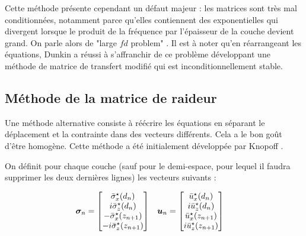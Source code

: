Cette méthode présente cependant un défaut majeur : les matrices sont très mal conditionnées, notamment parce qu'elles contiennent des exponentielles qui divergent lorsque le produit de la fréquence par l'épaisseur de la couche devient grand. On parle alors de "large $fd$ problem" \cite{Lowe_review}. Il est à noter qu'en réarrangeant les équations, Dunkin \cite{Dunkin1965,Lowe_review} a réussi à s'affranchir de ce problème développant une méthode de matrice de transfert modifié qui est inconditionnellement stable.



\subsection{Méthode de la matrice de raideur}



Une méthode alternative consiste à réécrire les équations en séparant le déplacement et la contrainte dans des vecteurs différents. Cela a le bon goût d'être homogène. Cette méthode a été initialement développée par Knopoff \cite{Knopoff}.\par

On définit pour chaque couche (sauf pour le demi-espace, pour lequel il faudra supprimer les deux dernières lignes) les vecteurs suivants :\par

\begin{align*}
    \bm{\sigma}_n &= \begin{bmatrix} \bar{\sigma}^\star_{x}(d_n) \\ i \bar{\sigma}^\star_{z}(d_n)\\  -\bar{\sigma}^\star_{x}(z_{n+1}) \\ -i \bar{\sigma}^\star_{z}(z_{n+1}) \end{bmatrix} &
    \bm{u}_n &= \begin{bmatrix} \bar{u}^\star_x(d_n)  \\ i \bar{u}^\star_z(d_n)\\  \bar{u}^\star_x(z_{n+1})  \\ i\bar{u}^\star_z(z_{n+1})\end{bmatrix}
\end{align*}

